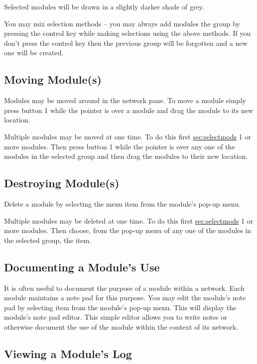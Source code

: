 Selected modules will be drawn in a slightly darker shade of grey.

You may mix selection methods -- you may always add modules the group by
pressing the control key while making selections using the above methods.
If you don't press the control key then the previous group will be
forgotten and a new one will be created.

\subsection{Moving Module(s)}
\label{sec:movemod}

Modules may be moved around in the network pane.  To move a module simply
press button 1 while the pointer is over a module and drag the module to
its new location.

Multiple modules may be moved at one time.  To do this first
\hyperref{select}{select (see Section~}{)}{sec:selectmods} 1 or more
modules. Then press button 1 while the pointer is over any one of the
modules in the selected group and then drag the modules to their new location.


\subsection{Destroying Module(s)}
\label{sec:destroymod}

Delete a module by selecting the  menu item from the
module's pop-up menu.

Multiple modules may be deleted at one time.  To do this first
\hyperref{select}{select (see Section~}{)}{sec:selectmods} 1 or more
modules. Then choose, from the pop-up menu of any one of the modules in the
selected group, the  item.


\subsection{Documenting a Module's Use}
\label{sec:docmodule}

It is often useful to document the purpose of a module within a network.
Each module maintains a note pad for this purpose.  You may edit the
module's note pad by selecting  item from the module's
pop-up menu.  This will display the module's note pad editor.  This simple
editor allows you to write notes or otherwise document the use of the
module within the context of its network.

\subsection{Viewing a Module's Log}
\label{sec:viewmodslog}

